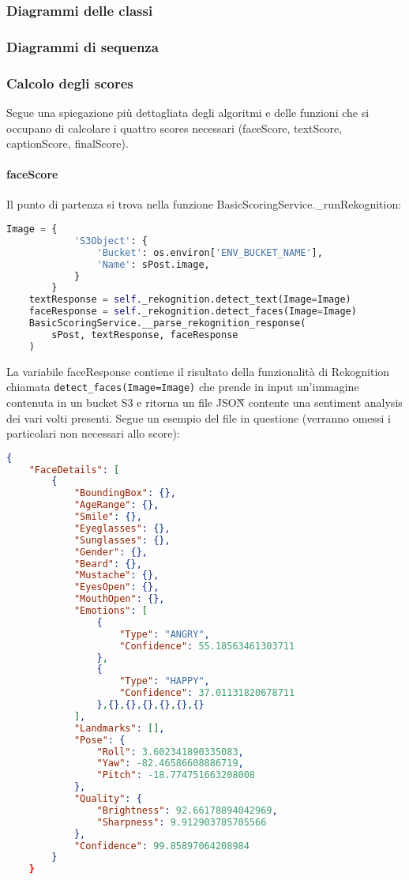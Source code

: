 \subsubsection{Diagrammi delle classi}
\subsubsection{Diagrammi di sequenza}
\subsubsection{Calcolo degli scores}
Segue una spiegazione più dettagliata degli algoritmi e delle funzioni che si occupano di calcolare
i quattro scores necessari (faceScore, textScore, captionScore, finalScore).
\paragraph{faceScore} \aCapo
Il punto di partenza si trova nella funzione BasicScoringService.\_runRekognition:
\begin{lstlisting}[language=Python]
    Image = {
            'S3Object': {
                'Bucket': os.environ['ENV_BUCKET_NAME'],
                'Name': sPost.image,
            }
        }
    textResponse = self._rekognition.detect_text(Image=Image)
    faceResponse = self._rekognition.detect_faces(Image=Image)
    BasicScoringService.__parse_rekognition_response(
        sPost, textResponse, faceResponse
    )
\end{lstlisting}
La variabile faceResponse contiene il risultato della funzionalità
di Rekognition chiamata \verb+detect_faces(Image=Image)+ che prende in input un'immagine contenuta
in un bucket S3 e ritorna un file JSON\G{} contente una sentiment analysis dei vari volti presenti.
Segue un esempio del file in questione (verranno omessi i particolari non necessari allo score):
\begin{lstlisting}[language=JSON]
    {
    "FaceDetails": [
        {
            "BoundingBox": {},
            "AgeRange": {},
            "Smile": {},
            "Eyeglasses": {},
            "Sunglasses": {},
            "Gender": {},
            "Beard": {},
            "Mustache": {},
            "EyesOpen": {},
            "MouthOpen": {},
            "Emotions": [
                {
                    "Type": "ANGRY",
                    "Confidence": 55.18563461303711
                },
                {
                    "Type": "HAPPY",
                    "Confidence": 37.01131820678711
                },{},{},{},{},{},{}
            ],
            "Landmarks": [],
            "Pose": {
                "Roll": 3.602341890335083,
                "Yaw": -82.46586608886719,
                "Pitch": -18.774751663208008
            },
            "Quality": {
                "Brightness": 92.66178894042969,
                "Sharpness": 9.912903785705566
            },
            "Confidence": 99.85897064208984
        }
    }
\end{lstlisting}
